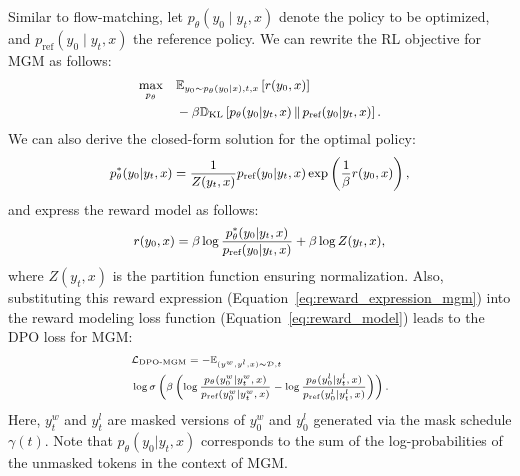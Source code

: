 \documentclass[11pt]{article}
\begin{document}
Similar to flow-matching, let \(p_\theta(y_0 \mid y_t, x)\) denote the policy to be optimized, and \(p_{\text{ref}}(y_0 \mid y_t, x)\) the reference policy. We can rewrite the RL objective for MGM as follows:
\begin{equation}
{\small
\begin{aligned}
\max_{p_\theta} \quad & \mathbb{E}_{y_0 \sim p_\theta(y_0|x), t, x} \left[ r(y_0, x) \right] \\
& - \beta \mathbb{D}_{\text{KL}} \left[ p_\theta(y_0|y_t,x) \,\|\, p_{\text{ref}}(y_0|y_t,x) \right].
\end{aligned}
}
\end{equation}
We can also derive the closed-form solution for the optimal policy:
\begin{equation}
{\small
\begin{aligned}
p_\theta^*(y_0 | y_t, x) = \frac{1}{Z(y_t, x)} p_{\text{ref}}(y_0 | y_t, x) \exp\left(\frac{1}{\beta} r(y_0, x)\right),
\end{aligned}
}
\end{equation}
and express the reward model as follows:
\begin{equation}
{\small
\begin{aligned}
r(y_0, x) = \beta \log \frac{p_\theta^*(y_0 | y_t, x)}{p_{\text{ref}}(y_0 | y_t, x)} + \beta \log Z(y_t, x),
\end{aligned}
}
\label{eq:reward_expression_mgm}
\end{equation}
where \( Z(y_t, x) \) is the partition function ensuring normalization.
Also, substituting this reward expression (Equation~\ref{eq:reward_expression_mgm}) into the reward modeling loss function (Equation~\ref{eq:reward_model}) leads to the DPO loss for MGM:
\begin{equation}
{\scriptsize
\begin{aligned}
& \mathcal{L}_{\text{DPO-MGM}} = -\mathbb{E}_{(y^w, y^l, x) \sim \mathcal{D}, t}  \\
& \log \sigma \left( \beta \left( \log \frac{p_\theta(y^w_0|y^w_t,x)}{p_{\text{ref}}(y^w_0|y^w_t,x)}
 - \log \frac{p_\theta(y^l_0|y^l_t,x)}{p_{\text{ref}}(y^l_0|y^l_t,x)} \right) \right).
\end{aligned}
}
\end{equation}
Here, \(y^w_t\) and \(y^l_t\) are masked versions of \(y^w_0\) and \(y^l_0\) generated via the mask schedule \(\gamma(t)\). Note that $p_\theta(y_0|y_t,x)$ corresponds to the sum of the log-probabilities of the unmasked tokens in the context of MGM.
\end{document}
